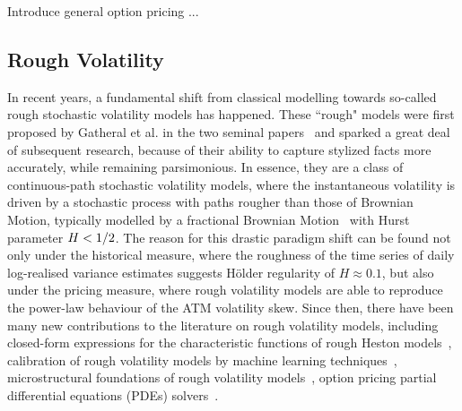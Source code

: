 Introduce general option pricing ...



\subsection{Rough Volatility}
In recent years, a fundamental shift from classical modelling towards so-called rough stochastic volatility models has happened. These ``rough" models were first proposed by Gatheral et al. in the two seminal papers~\cite{Gatheral2018VolatilityRough, Bayer2015PricingVolatility} and sparked a great deal of subsequent research, because of their ability to capture stylized facts more accurately, while remaining parsimonious. In essence, they are a class of continuous-path stochastic volatility models, where the instantaneous volatility is driven by a stochastic process with paths rougher than those of Brownian Motion, typically modelled by a fractional Brownian Motion~\cite{Mandelbrot1968FractionalApplications} with Hurst parameter $H <\nobreak 1/2$. The reason for this drastic paradigm shift can be found not only under the historical measure, where the roughness of the time series of daily log-realised variance estimates suggests H{\"o}lder regularity of $H\approx 0.1$, but also under the pricing measure, where rough volatility models are able to reproduce the power-law behaviour of the ATM volatility skew. Since then, there have been many new contributions to the literature on rough volatility models, including closed-form expressions for the characteristic functions of rough Heston models~\cite{Euch2018TheModels}, calibration of rough volatility models by machine learning techniques~\cite{Horvath2020DeepModels}, microstructural foundations of rough volatility models~\cite{Euch2018TheVolatility}, option pricing partial differential equations (PDEs) solvers~\cite{Jacquier2019DeepVolatility, Bayer2022PricingSPDEs}.


